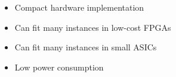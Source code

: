 \begin{itemize}
\item Compact hardware implementation
\item Can fit many instances in low-cost FPGAs
\item Can fit many instances in small ASICs 
\item Low power consumption
\end{itemize}
